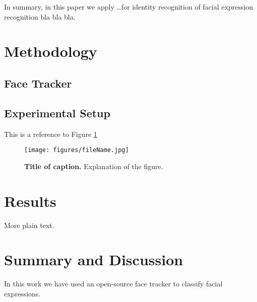 \documentclass[]{article}
\begin{document}
In summary, in this paper we apply \ldots for identity recognition of facial expression recognition bla bla bla.



\section{Methodology}
\subsection{Face Tracker}

\subsection{Experimental Setup}
This is a reference to Figure \ref{figureLabel}

\begin{figure}[ht]
\begin{center}
\vspace{-3mm}
\texttt{[image: figures/fileName.jpg]}
\end{center}
\caption{\textbf{Title of caption.} Explanation of the figure.}
\label{figureLabel}
\end{figure}


\section{Results}
More plain text.

\section{Summary and Discussion}
In this work we have used an open-source face tracker to classify facial expressions.




\end{document}
